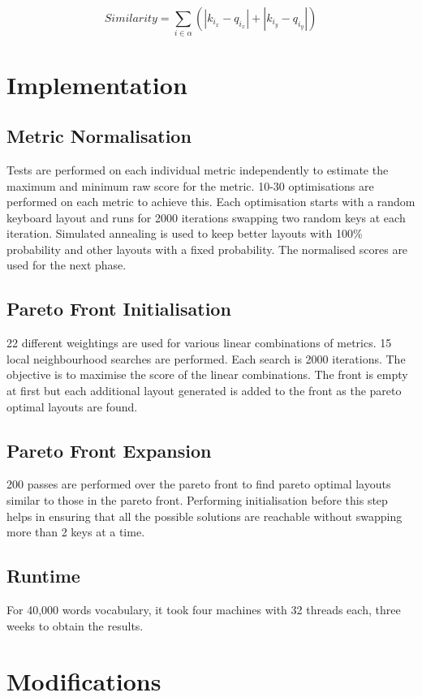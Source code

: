 \documentclass[12pt]{article}
\begin{document}
\[ Similarity = \sum_{i \in \alpha} (|k_{i_{x}}-q_{i_{x}}| + |k_{i_{y}}-q_{i_{y}}|)\]


\section{Implementation}

\subsection{Metric Normalisation}
Tests are performed on each individual metric independently to estimate the maximum and minimum raw score for the metric.
10-30 optimisations are performed on each metric to achieve this.
Each optimisation starts with a random keyboard layout and runs for 2000 iterations swapping two random keys at each iteration.
Simulated annealing is used to keep better layouts with 100\% probability and other layouts with a fixed probability.
The normalised scores are used for the next phase.

\subsection{Pareto Front Initialisation}
22 different weightings are used for various linear combinations of metrics.
15 local neighbourhood searches are performed. Each search is 2000 iterations.
The objective is to maximise the score of the linear combinations.
The front is empty at first but each additional layout generated is added to the front as the pareto optimal layouts are found.


\subsection{Pareto Front Expansion}
200 passes are performed over the pareto front to find pareto optimal layouts similar to those in the pareto front.
Performing initialisation before this step helps in ensuring that all the possible solutions are reachable without swapping more than 2 keys at a time.

\subsection{Runtime}
For 40,000 words vocabulary, it took four machines with 32 threads each, three weeks to obtain the results.

\section{Modifications}
\end{document}
